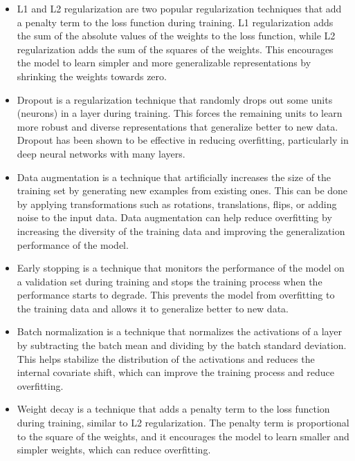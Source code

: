 \begin{itemize}
	\item L1 and L2 regularization are two popular regularization techniques that add a penalty term to the loss function during training. L1 regularization adds the sum of the absolute values of the weights to the loss function, while L2 regularization adds the sum of the squares of the weights. This encourages the model to learn simpler and more generalizable representations by shrinking the weights towards zero.
	\item Dropout is a regularization technique that randomly drops out some units (neurons) in a layer during training. This forces the remaining units to learn more robust and diverse representations that generalize better to new data. Dropout has been shown to be effective in reducing overfitting, particularly in deep neural networks with many layers.
	
	\item Data augmentation is a technique that artificially increases the size of the training set by generating new examples from existing ones. This can be done by applying transformations such as rotations, translations, flips, or adding noise to the input data. Data augmentation can help reduce overfitting by increasing the diversity of the training data and improving the generalization performance of the model.
	
	\item Early stopping is a technique that monitors the performance of the model on a validation set during training and stops the training process when the performance starts to degrade. This prevents the model from overfitting to the training data and allows it to generalize better to new data.
	
	\item Batch normalization is a technique that normalizes the activations of a layer by subtracting the batch mean and dividing by the batch standard deviation. This helps stabilize the distribution of the activations and reduces the internal covariate shift, which can improve the training process and reduce overfitting.
	
	\item Weight decay is a technique that adds a penalty term to the loss function during training, similar to L2 regularization. The penalty term is proportional to the square of the weights, and it encourages the model to learn smaller and simpler weights, which can reduce overfitting.
	
\end{itemize}

